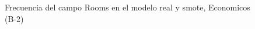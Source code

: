 \begin{figure}[H]
    \centering
    
    \caption{Frecuencia del campo Rooms en el modelo real y smote, Economicos (B-2)}
    \label{frecuency-Rooms-smote-enc}
\end{figure}